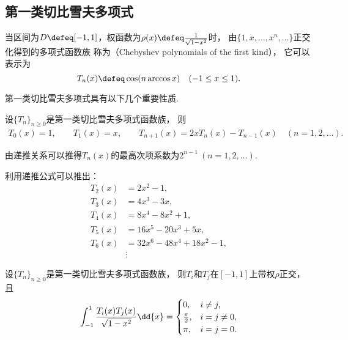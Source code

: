 \subsection{第一类切比雪夫多项式}
当区间为\(D \defeq [-1,1]\)，权函数为\(\rho(x) \defeq \frac1{\sqrt{1-x^2}}\)时，
由\(\{1,x,\dotsc,x^n,\dotsc\}\)正交化得到的多项式函数族
称为（Chebyshev polynomials of the first kind），
它可以表示为\begin{equation}
	T_n(x) \defeq \cos(n \arccos x)
	\quad(-1 \leq x \leq 1).
\end{equation}

第一类切比雪夫多项式具有以下几个重要性质.
\begin{property}
设\(\{T_n\}_{n\geq0}\)是第一类切比雪夫多项式函数族，
则\begin{gather}
	T_0(x) = 1,
	\qquad
	T_1(x) = x,
	\qquad
	T_{n+1}(x) = 2x T_n(x) - T_{n-1}(x)
	\quad(n=1,2,\dotsc).
\end{gather}
\end{property}
\begin{remark}
由递推关系可以推得\(T_n(x)\)的最高次项系数为\(2^{n-1}\ (n=1,2,\dotsc)\).
\end{remark}

利用递推公式可以推出：\begin{align*}
	T_2(x) &= 2x^2-1, \\
	T_3(x) &= 4x^3-3x, \\
	T_4(x) &= 8x^4-8x^2+1, \\
	T_5(x) &= 16x^5-20x^3+5x, \\
	T_6(x) &= 32x^6-48x^4+18x^2-1, \\
	&\vdots
\end{align*}

\begin{property}
设\(\{T_n\}_{n\geq0}\)是第一类切比雪夫多项式函数族，
则\(T_i\)和\(T_j\)在\([-1,1]\)上带权\(\rho\)正交，
且\begin{equation}
	\def\arraystretch{1.5}
	\int_{-1}^1 \frac{T_i(x) T_j(x)}{\sqrt{1-x^2}} \dd{x}
	= \begin{cases}
		0, & i \neq j, \\
		\frac\pi2, & i = j \neq 0, \\
		\pi, & i = j = 0.
	\end{cases}
\end{equation}
\end{property}

